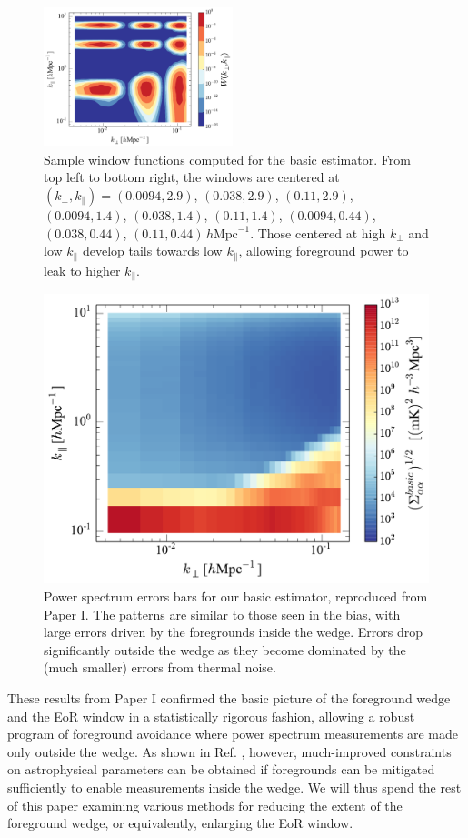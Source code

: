 \documentclass[twocolumn,aps,prd,nofootinbib,showpacs]{revtex4-1}
\begin{document}
\begin{figure}[!ht] 
	\centering 
	\includegraphics[width=0.49\textwidth]{figures/simpleEstWindowSummary.pdf}
	\caption{Sample window functions computed for the basic estimator.  From top left to bottom right, the windows are centered at $(k_\perp, k_\parallel) = (0.0094, 2.9)$, $(0.038, 2.9)$, $(0.11, 2.9)$, $(0.0094, 1.4)$, $(0.038, 1.4)$, $(0.11, 1.4)$, $(0.0094, 0.44)$, $(0.038, 0.44)$, $(0.11, 0.44)\,h\textrm{Mpc}^{-1}$.  Those centered at high $k_\perp$ and low $k_\parallel$ develop tails towards low $k_\parallel$, allowing foreground power to leak to higher $k_\parallel$.}
	\label{fig:basicEstWindowsSummary}
\end{figure} 

\begin{figure}[!ht] 
	\centering 
	\includegraphics[width=.49\textwidth]{figures/simpleEstErrorBars.pdf}
	\caption{Power spectrum errors bars for our basic estimator, reproduced from Paper I.  The patterns are similar to those seen in the bias, with large errors driven by the foregrounds inside the wedge.  Errors drop significantly outside the wedge as they become dominated by the (much smaller) errors from thermal noise.}
	\label{fig:basicEstErrors}
\end{figure} 

These results from Paper I confirmed the basic picture of the foreground wedge and the EoR window in a statistically rigorous fashion, allowing a robust program of foreground avoidance where power spectrum measurements are made only outside the wedge.  As shown in Ref. \cite{Pober2014}, however, much-improved constraints on astrophysical parameters can be obtained if foregrounds can be mitigated sufficiently to enable measurements inside the wedge.  We will thus spend the rest of this paper examining various methods for reducing the extent of the foreground wedge, or equivalently, enlarging the EoR window.
\end{document}
